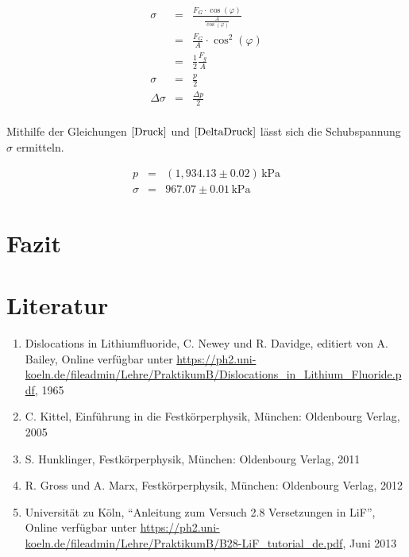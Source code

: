 \documentclass[12pt,a4paper]{scrartcl}
\numberwithin{equation}{section} %
\renewcommand{\[}{} %
\renewcommand{\]}{\noindent} %
\newcommand{\tightlist}{} %
\begin{document}
\[
\begin{eqnarray}
    \sigma &=& \frac{F_G \cdot \cos(\varphi)}{\frac{A}{\cos(\varphi)}}\\
        &=&\frac{F_G}{A} \cdot \cos^2(\varphi) \\
        &=& \frac{1}{2}\frac{F_g}{A}\\
    \sigma &=& \frac{p}{2} \\
    \Delta \sigma &=& \frac{\Delta p}{2}\\
\end{eqnarray}
\]

Mithilfe der Gleichungen \(\eqref{Druck}\) und \(\eqref{DeltaDruck}\)
lässt sich die Schubspannung \(\sigma\) ermitteln.

\[
\begin{eqnarray}
    p &=& (1,934.13 \pm 0.02) \mathrm{\,kPa} \\
    \sigma &=& 967.07 \pm 0.01 \mathrm{\,kPa}
\end{eqnarray}
\]

\hypertarget{fazit}{%
\section{Fazit}\label{fazit}}

\hypertarget{literatur}{%
\section{Literatur}\label{literatur}}

\begin{enumerate}
\def\labelenumi{\arabic{enumi}.}
\tightlist
\item
  Dislocations in Lithiumfluoride, C. Newey und R. Davidge, editiert von
  A. Bailey, Online verfügbar unter
  \url{https://ph2.uni-koeln.de/fileadmin/Lehre/PraktikumB/Dislocations_in_Lithium_Fluoride.pdf},
  1965
\item
  C. Kittel, Einführung in die Festkörperphysik, München: Oldenbourg
  Verlag, 2005
\item
  S. Hunklinger, Festkörperphysik, München: Oldenbourg Verlag, 2011
\item
  R. Gross und A. Marx, Festkörperphysik, München: Oldenbourg Verlag,
  2012
\item
  Universität zu Köln, ``Anleitung zum Versuch 2.8 Versetzungen in
  LiF'', Online verfügbar unter
  \url{https://ph2.uni-koeln.de/fileadmin/Lehre/PraktikumB/B28-LiF_tutorial_de.pdf},
  Juni 2013
\end{enumerate}
\end{document}
